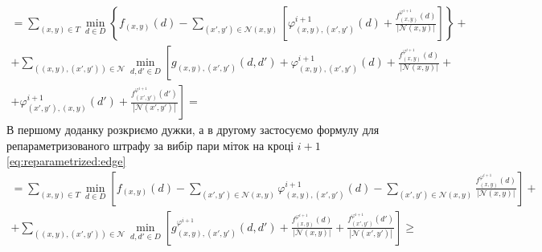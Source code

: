 \begin{equation*}
\begin{gathered}
    = \sum \limits_{\left(x, y \right) \in T}
        \min \limits_{d \in D} \left\{
            f_{ \left(x, y \right)} \left( d \right) -
            \sum \limits_{\left(x', y' \right) \in \mathcal{N}\left(x, y \right)}
            \left[
                \varphi_{\left(x, y \right), \left(x', y' \right)}^{i + 1}
                    \left( d \right) +
                \frac{f_{\left(x, y \right)}^{\varphi^{i + 1}} \left( d \right)}{\left| \mathcal{N} \left(x, y \right) \right|}
            \right]
        \right\} + \\
    + \sum \limits_{\left( \left(x, y \right), \left(x', y' \right) \right) \in \mathcal{N}}
        \min \limits_{d, d' \in D} \left[
            g_{\left(x, y \right), \left(x', y' \right)} \left( d, d' \right) +
            \varphi_{\left(x, y \right), \left(x', y' \right)}^{i + 1}
                \left( d \right) +
            \frac{f_{\left( x, y \right)}^{\varphi^{i + 1}} \left( d \right)}{\left| \mathcal{N}\left( x, y \right) \right|}
            + \right. \\
            \left. + \varphi_{\left(x', y' \right), \left(x, y \right)}^{i + 1}
                \left( d' \right) +
            \frac{f_{\left( x', y' \right)}^{\varphi^{i + 1}} \left( d' \right)}{\left| \mathcal{N}\left( x', y' \right) \right|}
        \right] =
\end{gathered}
\end{equation*}
В першому доданку розкриємо дужки,
а в другому застосуємо формулу для репараметризованого штрафу за вибір пари
міток на кроці $i + 1$
\eqref{eq:reparametrized:edge}
\begin{equation*}
\begin{gathered}
    = \sum \limits_{\left(x, y \right) \in T}
        \min \limits_{d \in D} \left[
            f_{\left(x, y \right)} \left( d \right) -
            \sum \limits_{\left(x' ,y' \right) \in \mathcal{N}\left( x, y \right)}
                \varphi_{\left(x, y \right), \left(x', y' \right)}^{i + 1}
                    \left( d \right) -
            \sum \limits_{\left(x', y' \right) \in \mathcal{N}\left( x, y \right)}
                \frac{f_{\left( x, y \right)}^{\varphi^{i + 1}}\left( d \right)}{\left|\mathcal{N}\left(x, y \right) \right|}
        \right] + \\
    + \sum \limits_{\left( \left(x, y \right), \left(x', y' \right) \right) \in \mathcal{N}}
        \min \limits_{d, d' \in D} \left[
            g_{\left(x, y \right), \left(x', y' \right)}^{\varphi^{i + 1}}
                \left( d, d'\right) +
            \frac{f_{\left(x, y \right)}^{\varphi^{i + 1}}\left( d \right)}{\left| \mathcal{N}\left(x, y \right) \right|} +
            \frac{f_{\left(x', y' \right)}^{\varphi^{i + 1}}\left( d' \right)}{\left| \mathcal{N}\left(x', y' \right) \right|}
        \right] \ge
\end{gathered}
\end{equation*}
